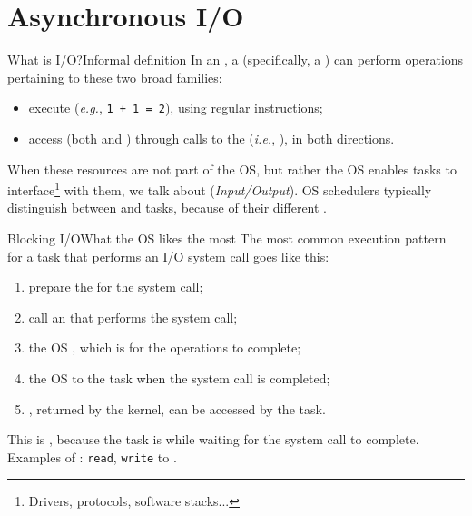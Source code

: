 
\section{Asynchronous I/O}
\graphicspath{{figs/section1/}}

\begin{frame}{What is I/O?}{Informal definition}
  In an , a  (specifically, a ) can perform operations pertaining to these two broad families:
  \begin{itemize}
    \item execute  (\emph{e.g.}, \texttt{1 + 1 = 2}), using regular  instructions;
    \item access  (both  and ) through calls to the  (\emph{i.e.}, ),  in both directions.
  \end{itemize}
  When these resources are not part of the OS, but rather the OS enables tasks to interface\footnote{Drivers, protocols, software stacks...} with them, we talk about  (\emph{Input/Output}).
  \newline\newline
  OS schedulers typically distinguish between  and  tasks, because of their different .
\end{frame}

\begin{frame}{Blocking I/O}{What the OS likes the most}
  The most common execution pattern for a task that performs an I/O system call goes like this:
  \begin{enumerate}
    \item prepare the  for the system call;
    \item call an  that performs the system call;
    \item the OS , which is  for the operations to complete;
    \item the OS  to the task when the system call is completed;
    \item {}, returned by the kernel, can be accessed by the task.
  \end{enumerate}
  This is , because the task is  while waiting for the system call to complete.
  \newline\newline
  Examples of : \texttt{read}, \texttt{write} to .
\end{frame}

